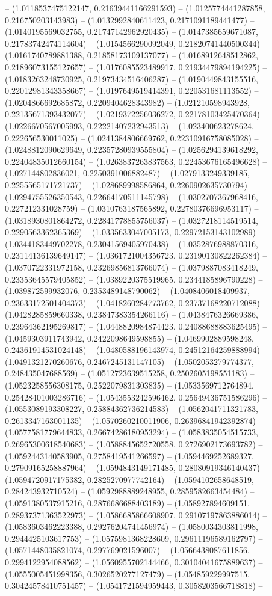 -- (1.0118537475122147, 0.21639441166291593) -- (1.0125774441287858, 0.216750203143983) -- (1.0132992840611423, 0.2171091189441477) -- (1.0140195569032755, 0.21747142962920435) -- (1.0147385659671087, 0.21783742474114604) -- (1.0154566290092049, 0.21820741440500344) -- (1.0161740789881388, 0.21858173109137077) -- (1.0168912648512862, 0.21896073155127657) -- (1.0176085523489917, 0.21934479894194225) -- (1.0183263248730925, 0.21973434516406287) -- (1.0190449843155516, 0.22012981343358667) -- (1.0197649519414391, 0.220531681113552) -- (1.0204866692685872, 0.2209404628343982) -- (1.021210598943928, 0.22135671393432077) -- (1.0219372256036272, 0.22178103425470364) -- (1.0226670567005993, 0.22221407232943513) -- (1.023400623278624, 0.222656530011025) -- (1.0241384806669762, 0.22310916758085028) -- (1.0248812090629649, 0.22357280939555804) -- (1.0256294139618292, 0.22404835012660154) -- (1.0263837263837563, 0.22453676165496628) -- (1.027144802836021, 0.2250391006882487) -- (1.0279133249339185, 0.2255565171721737) -- (1.028689998586864, 0.2260902635730794) -- (1.0294755526350543, 0.22664170511145798) -- (1.0302707367968416, 0.227212331028759) -- (1.0310763187565892, 0.22780376696953117) -- (1.0318930801864272, 0.22841778855756037) -- (1.0327218114519514, 0.2290563362365369) -- (1.0335633047005173, 0.22972153143102989) -- (1.0344183449702278, 0.23041569405970438) -- (1.0352876988870316, 0.23114136139649147) -- (1.0361721004356723, 0.23190130822262384) -- (1.0370722331972158, 0.23269856813766074) -- (1.0379887083418249, 0.23353645579405852) -- (1.0389220375519965, 0.2344185896790228) -- (1.039872599932076, 0.2353489148790062) -- (1.0408406018409937, 0.23633172501404373) -- (1.0418260284773762, 0.23737168220712088) -- (1.0428285859660338, 0.23847383354266116) -- (1.0438476326669386, 0.23964362195269817) -- (1.0448820984874423, 0.24088688883625495) -- (1.0459303911743942, 0.2422098649598855) -- (1.0469902889598248, 0.24361914531024148) -- (1.0480588196143974, 0.24512164259888994) -- (1.0491321270260676, 0.2467245131147105) -- (1.0502053279774377, 0.248435047688569) -- (1.0512723639515258, 0.2502605198551183) -- (1.0523258556308175, 0.2522079831303835) -- (1.0533569712764894, 0.25428401003286716) -- (1.0543553242596462, 0.25649436751586296) -- (1.0553089193308227, 0.25884362736214583) -- (1.0562041711321783, 0.2613347163001135) -- (1.0570260210011906, 0.26396841942392874) -- (1.0577581779644833, 0.26674286180953294) -- (1.0583835054515733, 0.26965300618540683) -- (1.0588845652720558, 0.2726902173693782) -- (1.0592443140583905, 0.2758419541266597) -- (1.0594469252689327, 0.27909165258887964) -- (1.0594843149171485, 0.28080919346140437) -- (1.0594720917175382, 0.2825270977742164) -- (1.0594102658648519, 0.284243932710524) -- (1.0592988889248955, 0.2859582663454484) -- (1.0591380537915216, 0.2876686688403189) -- (1.058927894609151, 0.28937371363522973) -- (1.0586685866608907, 0.29107197863886014) -- (1.0583603462223388, 0.29276204741456974) -- (1.0580034303811998, 0.2944425103617753) -- (1.0575981368228609, 0.29611196589162797) -- (1.0571448035821074, 0.297769021596007) -- (1.0566438087611856, 0.2994122954088562) -- (1.0560955702144466, 0.30104041675889637) -- (1.0555005451998356, 0.3026520277127479) -- (1.054859229997515, 0.30424578410751457) -- (1.0541721594959443, 0.3058203566718818) -- 